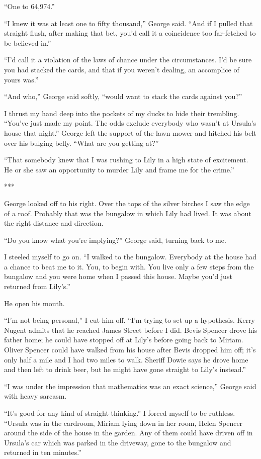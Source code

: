 \documentclass{novel}
\begin{document}
{“One to 64,974.”

“I knew it was at least one to fifty thousand,” George said. “And if I pulled that straight flush, after making that bet, you’d call it a coincidence too far-fetched to be believed in.”

“I’d call it a violation of the laws of chance under the circumstances. I’d be sure you had stacked the cards, and that if you weren’t dealing, an accomplice of yours was.”

“And who,” George said softly, “would want to stack the cards against you?”

I thrust my hand deep into the pockets of my ducks to hide their trembling. “You’ve just made my point. The odds exclude everybody who wasn’t at Ursula’s house that night.” George left the support of the lawn mower and hitched his belt over his bulging belly. “What are you getting at?”

“That somebody knew that I was rushing to Lily in a high state of excitement. He or she saw an opportunity to murder Lily and frame me for the crime.”

***

George looked off to his right. Over the tops of the silver birches I saw the edge of a roof. Probably that was the bungalow in which Lily had lived. It was about the right distance and direction.

“Do you know what you’re implying?” George said, turning back to me.

I steeled myself to go on. “I walked to the bungalow. Everybody at the house had a chance to beat me to it. You, to begin with. You live only a few steps from the bungalow and you were home when I passed this house. Maybe you’d just returned from Lily’s.”

He open his mouth.

“I’m not being personal,” I cut him off. “I’m trying to set up a hypothesis. Kerry Nugent admits that he reached James Street before I did. Bevis Spencer drove his father home; he could have stopped off at Lily’s before going back to Miriam. Oliver Spencer could have walked from his house after Bevis dropped him off; it’s only half a mile and I had two miles to walk. Sheriff Dowie says he drove home and then left to drink beer, but he might have gone straight to Lily’s instead.”

“I was under the impression that mathematics was an exact science,” George said with heavy sarcasm.

“It’s good for any kind of straight thinking.” I forced myself to be ruthless. “Ursula was in the cardroom, Miriam lying down in her room, Helen Spencer around the side of the house in the garden. Any of them could have driven off in Ursula’s car which was parked in the driveway, gone to the bungalow and returned in ten minutes.”

}
\end{document}
